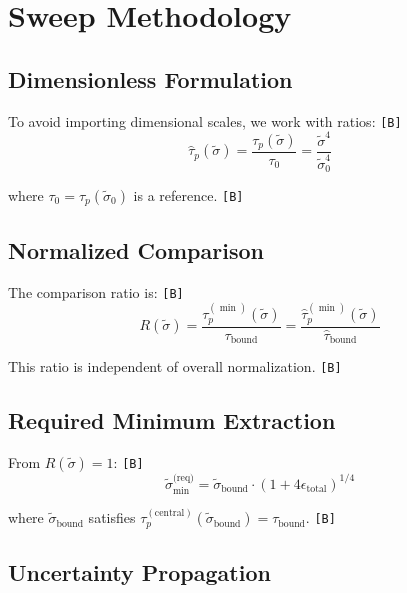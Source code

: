 \documentclass[11pt,a4paper]{article}
\newcommand{\tagB}{\textcolor{purple!70!black}{\texttt{[B]}}}
\theoremstyle{definition}
\begin{document}
\section{Sweep Methodology}
\label{sec:methodology}

\subsection{Dimensionless Formulation}
\label{subsec:dimensionless}

To avoid importing dimensional scales, we work with ratios: \tagB{}
\begin{equation}
\label{eq:dimensionless-tau}
\hat{\tau}_p(\tilde{\sigma}) = \frac{\tau_p(\tilde{\sigma})}{\tau_0} = \frac{\tilde{\sigma}^4}{\tilde{\sigma}_0^4}
\end{equation}

where $\tau_0 = \tau_p(\tilde{\sigma}_0)$ is a reference. \tagB{}

\subsection{Normalized Comparison}
\label{subsec:normalized}

The comparison ratio is: \tagB{}
\begin{equation}
\label{eq:normalized-ratio}
R(\tilde{\sigma}) = \frac{\tau_p^{(\min)}(\tilde{\sigma})}{\tau_{\text{bound}}} = \frac{\hat{\tau}_p^{(\min)}(\tilde{\sigma})}{\hat{\tau}_{\text{bound}}}
\end{equation}

This ratio is independent of overall normalization. \tagB{}

\subsection{Required Minimum Extraction}
\label{subsec:minimum-extraction}

From $R(\tilde{\sigma}) = 1$: \tagB{}
\begin{equation}
\label{eq:min-extraction}
\tilde{\sigma}_{\min}^{\text{(req)}} = \tilde{\sigma}_{\text{bound}} \cdot (1 + 4\epsilon_{\text{total}})^{1/4}
\end{equation}

where $\tilde{\sigma}_{\text{bound}}$ satisfies $\tau_p^{(\text{central})}(\tilde{\sigma}_{\text{bound}}) = \tau_{\text{bound}}$. \tagB{}

\subsection{Uncertainty Propagation}
\label{subsec:uncertainty-prop}
\end{document}
